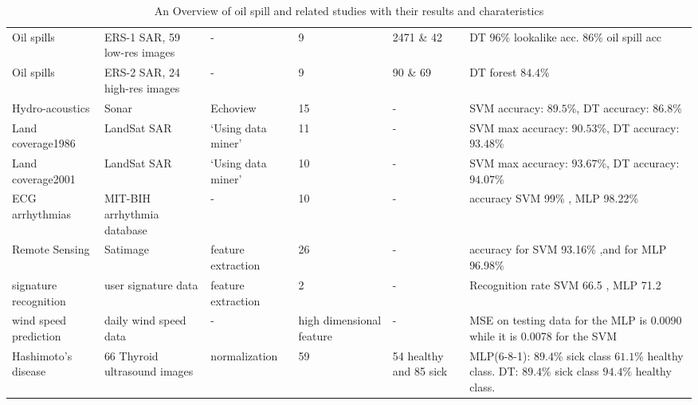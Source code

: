 \begin{table*}[t]
\begin{adjustbox}{width=\textwidth,totalheight=\textheight,keepaspectratio}
\begin{tabular}{*{6}{|l|}}
        Oil spills\cite{Delfrate1996} &  ERS-1 SAR, 59 low-res images & - & 9 & 2471 \& 42  & DT $96$\% lookalike acc. $86$\% oil spill acc\\
        
        Oil spills\cite{Topouzelis201268} &  ERS-2 SAR, 24 high-res images & - & 9 & 90  \& 69  & DT forest $84.4$\%\\ 
        
  
    Hydro-acoustics \cite{Robotham2011170} & Sonar & Echoview & 15 &  - & SVM accuracy: $89.5$\%, DT accuracy: $86.8$\% \\

    Land coverage1986 \cite{Otukei2010S27} & LandSat SAR & `Using data miner' & 11 &  - & SVM max accuracy: $90.53$\%, DT accuracy: $93.48$\% \\

    Land coverage2001 \cite{Otukei2010S27} & LandSat SAR & `Using data miner' & 10 &  - & SVM max accuracy: $93.67$\%, DT accuracy: $94.07$\% \\ 

    ECG arrhythmias\cite{Moavenian20103088} & MIT-BIH arrhythmia database & - & 10 & - & accuracy SVM 99\% , MLP 98.22\% \\

    Remote Sensing\cite{Zanaty2012177} & Satimage & feature extraction & 26& - & accuracy for SVM 93.16\% ,and for MLP 96.98\%\\
    
    signature recognition\cite{FriasMartinez2006693} & user signature data &feature extraction& 2 & - & Recognition rate SVM 66.5  , MLP 71.2\\
    wind speed prediction\cite{Mohandes2004939}& daily wind speed data & - &high dimensional feature & - & MSE on testing data for the MLP is 0.0090 while it is 0.0078 for the SVM\\
    
    Hashimoto's disease\cite{Omiotek201340} &  66 Thyroid ultrasound images & normalization & 59 & 54 healthy and 85 sick & MLP(6-8-1): $89.4$\% sick class $61.1$\% healthy class. DT: $89.4$\% sick class $94.4$\% healthy class. \\
    
    \bottomrule[1.5pt]
    
\end{tabular}
\end{adjustbox}
\caption{\footnotesize{An Overview of oil spill and related studies with their results and charateristics}}
\label{fig:table}
\end{table*}

